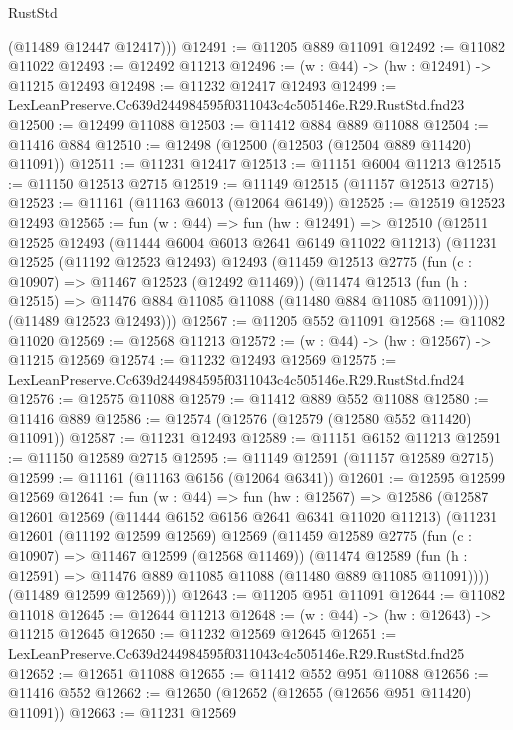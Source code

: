 \begin{lexlean}{RustStd}
\begin{coremodule}
        (@11489 @12447 @12417)))
@12491 := @11205 @889 @11091
@12492 := @11082 @11022
@12493 := @12492 @11213
@12496 := (w : @44) -> (hw : @12491) -> @11215 @12493
@12498 := @11232 @12417 @12493
@12499 := LexLeanPreserve.Cc639d244984595f0311043c4c505146e.R29.RustStd.fnd23
@12500 := @12499 @11088
@12503 := @11412 @884 @889 @11088
@12504 := @11416 @884
@12510 := @12498 (@12500 (@12503 (@12504 @889 @11420) @11091))
@12511 := @11231 @12417
@12513 := @11151 @6004 @11213
@12515 := @11150 @12513 @2715
@12519 := @11149 @12515 (@11157 @12513 @2715)
@12523 := @11161 (@11163 @6013 (@12064 @6149))
@12525 := @12519 @12523 @12493
@12565 := fun (w : @44) =>
  fun (hw : @12491) =>
  @12510
    (@12511
      @12525
      @12493
      (@11444 @6004 @6013 @2641 @6149 @11022 @11213)
      (@11231
        @12525
        (@11192 @12523 @12493)
        @12493
        (@11459
          @12513
          @2775
          (fun (c : @10907) => @11467 @12523 (@12492 @11469))
          (@11474
            @12513
            (fun (h : @12515) => @11476 @884 @11085 @11088 (@11480 @884 @11085 @11091))))
        (@11489 @12523 @12493)))
@12567 := @11205 @552 @11091
@12568 := @11082 @11020
@12569 := @12568 @11213
@12572 := (w : @44) -> (hw : @12567) -> @11215 @12569
@12574 := @11232 @12493 @12569
@12575 := LexLeanPreserve.Cc639d244984595f0311043c4c505146e.R29.RustStd.fnd24
@12576 := @12575 @11088
@12579 := @11412 @889 @552 @11088
@12580 := @11416 @889
@12586 := @12574 (@12576 (@12579 (@12580 @552 @11420) @11091))
@12587 := @11231 @12493
@12589 := @11151 @6152 @11213
@12591 := @11150 @12589 @2715
@12595 := @11149 @12591 (@11157 @12589 @2715)
@12599 := @11161 (@11163 @6156 (@12064 @6341))
@12601 := @12595 @12599 @12569
@12641 := fun (w : @44) =>
  fun (hw : @12567) =>
  @12586
    (@12587
      @12601
      @12569
      (@11444 @6152 @6156 @2641 @6341 @11020 @11213)
      (@11231
        @12601
        (@11192 @12599 @12569)
        @12569
        (@11459
          @12589
          @2775
          (fun (c : @10907) => @11467 @12599 (@12568 @11469))
          (@11474
            @12589
            (fun (h : @12591) => @11476 @889 @11085 @11088 (@11480 @889 @11085 @11091))))
        (@11489 @12599 @12569)))
@12643 := @11205 @951 @11091
@12644 := @11082 @11018
@12645 := @12644 @11213
@12648 := (w : @44) -> (hw : @12643) -> @11215 @12645
@12650 := @11232 @12569 @12645
@12651 := LexLeanPreserve.Cc639d244984595f0311043c4c505146e.R29.RustStd.fnd25
@12652 := @12651 @11088
@12655 := @11412 @552 @951 @11088
@12656 := @11416 @552
@12662 := @12650 (@12652 (@12655 (@12656 @951 @11420) @11091))
@12663 := @11231 @12569

\end{coremodule}
\end{lexlean}
